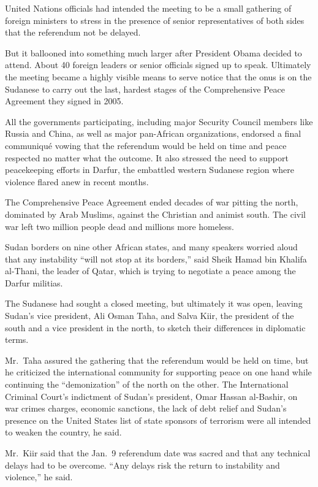 ﻿\documentclass[12pt]{article}
\begin{document}
United Nations officials had intended the meeting to be a small gathering of foreign ministers to
stress in the presence of senior representatives of both sides that the referendum not be delayed.

But it ballooned into something much larger after President Obama decided to attend. About 40
foreign leaders or senior officials signed up to speak. Ultimately the meeting became a highly
visible means to serve notice that the onus is on the Sudanese to carry out the last, hardest stages
of the Comprehensive Peace Agreement they signed in 2005.

All the governments participating, including major Security Council members like Russia and China,
as well as major pan-African organizations, endorsed a final communiqu\'e vowing that the referendum
would be held on time and peace respected no matter what the outcome. It also stressed the need to
support peacekeeping efforts in Darfur, the embattled western Sudanese region where violence flared
anew in recent months.

The Comprehensive Peace Agreement ended decades of war pitting the north, dominated by Arab Muslims,
against the Christian and animist south. The civil war left two million people dead and millions
more homeless.

Sudan borders on nine other African states, and many speakers worried aloud that any instability
``will not stop at its borders,'' said Sheik Hamad bin Khalifa al-Thani, the leader of Qatar, which
is trying to negotiate a peace among the Darfur militias.

The Sudanese had sought a closed meeting, but ultimately it was open, leaving Sudan's vice
president, Ali Osman Taha, and Salva Kiir, the president of the south and a vice president in the
north, to sketch their differences in diplomatic terms.

Mr.~Taha assured the gathering that the referendum would be held on time, but he criticized the
international community for supporting peace on one hand while continuing the ``demonization'' of
the north on the other. The International Criminal Court's indictment of Sudan's president, Omar
Hassan al-Bashir, on war crimes charges, economic sanctions, the lack of debt relief and Sudan's
presence on the United States list of state sponsors of terrorism were all intended to weaken the
country, he said.

Mr.~Kiir said that the Jan.~9 referendum date was sacred and that any technical delays had to be
overcome. ``Any delays risk the return to instability and violence,'' he said.
\end{document}
